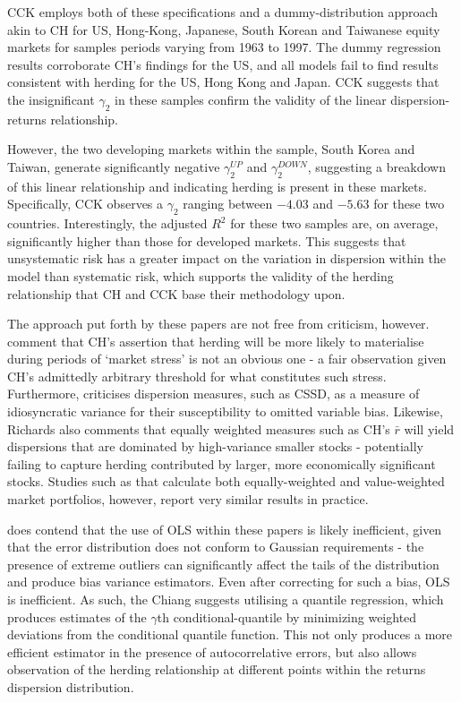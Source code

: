\documentclass[12pt]{article}
\numberwithin{table}{section}   %
\begin{document}
CCK employs both of these specifications and a dummy-distribution approach akin to CH for US, Hong-Kong, Japanese, South Korean and Taiwanese equity markets for samples periods varying from 1963 to 1997. The dummy regression results corroborate CH’s findings for the US, and all models fail to find results consistent with herding for the US, Hong Kong and Japan. CCK suggests that the insignificant $\gamma_2$ in these samples confirm the validity of the linear dispersion-returns relationship. 

However, the two developing markets within the sample, South Korea and Taiwan, generate significantly negative $\gamma_2^{UP}$ and $\gamma_2^{DOWN}$, suggesting a breakdown of this linear relationship and indicating herding is present in these markets. Specifically, CCK observes a $\gamma_2$ ranging between $-4.03$ and $-5.63$ for these two countries. Interestingly, the adjusted $R^2$ for these two samples are, on average, significantly higher than those for developed markets. This suggests that unsystematic risk has a greater impact on the variation in dispersion within the model than systematic risk, which supports the validity of the herding relationship that CH and CCK base their methodology upon.

The approach put forth by these papers are not free from criticism, however. \citet{hirshleifer_review} comment that CH’s assertion that herding will be more likely to materialise during periods of ‘market stress’ is not an obvious one - a fair observation given CH’s admittedly arbitrary threshold for what constitutes such stress. Furthermore, \citet{richards} criticises dispersion measures, such as CSSD, as a measure of idiosyncratic variance for their susceptibility to omitted variable bias. Likewise, Richards also comments that equally weighted measures such as CH’s $\bar{r}$ will yield dispersions that are dominated by high-variance smaller stocks - potentially failing to capture herding contributed by larger, more economically significant stocks. Studies such as \citet{chiang} that calculate both equally-weighted and value-weighted market portfolios, however, report very similar results in practice.

\citet{chiang} does contend that the use of OLS within these papers is likely inefficient, given that the error distribution does not conform to Gaussian requirements - the presence of extreme outliers can significantly affect the tails of the distribution and produce bias variance estimators. Even after correcting for such a bias, OLS is inefficient. As such, the Chiang suggests utilising a quantile regression, which produces estimates of the $\gamma$th conditional-quantile by minimizing weighted deviations from the conditional quantile function. This not only produces a more efficient estimator in the presence of autocorrelative errors, but also allows observation of the herding relationship at different points within the returns dispersion distribution.
\end{document}
